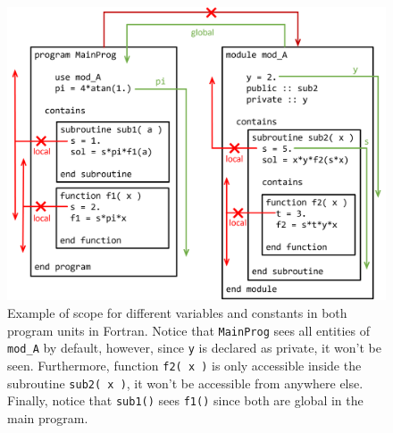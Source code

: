 \begin{figure}[h]
    \centering
    \includegraphics[width= \textwidth]{./doc/Figures/ScopeFor.png}
    \caption{Example of scope for different variables and constants in both program units in Fortran. Notice that \texttt{MainProg} sees all entities of \texttt{mod\_A} by default, however, since \texttt{y} is declared as private, it won't be seen. Furthermore, function \texttt{f2( x )} is only accessible inside the subroutine \texttt{sub2( x )}, it won't be accessible from anywhere else. Finally, notice that \texttt{sub1()} sees \texttt{f1()} since both are global in the main program.}
    \label{fig:ScopeFor}
\end{figure}


